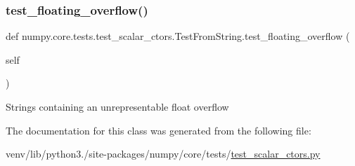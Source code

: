 \mbox{\label{classnumpy_1_1core_1_1tests_1_1test__scalar__ctors_1_1TestFromString_a9cfe61adf73f2d0bd89c8dc5f4db808e}} 
\subsubsection{\texorpdfstring{test\+\_\+floating\+\_\+overflow()}{test\_floating\_overflow()}}
{\footnotesize\ttfamily def numpy.\+core.\+tests.\+test\+\_\+scalar\+\_\+ctors.\+Test\+From\+String.\+test\+\_\+floating\+\_\+overflow (\begin{DoxyParamCaption}\item[{}]{self }\end{DoxyParamCaption})}

\begin{DoxyVerb}Strings containing an unrepresentable float overflow \end{DoxyVerb}
 

The documentation for this class was generated from the following file\+:\begin{DoxyCompactItemize}
\item 
venv/lib/python3./site-\/packages/numpy/core/tests/\hyperlink{test__scalar__ctors_8py}{test\+\_\+scalar\+\_\+ctors.\+py}\end{DoxyCompactItemize}
